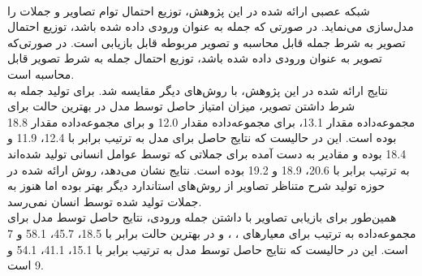\\
شبکه عصبی ارائه شده در این پژوهش، توزیع احتمال توام تصاویر و جملات را مدل‌سازی می‌نماید. در صورتی که جمله به عنوان ورودی داده شده باشد، توزیع احتمال تصویر به شرط جمله قابل محاسبه و تصویر مربوطه قابل بازیابی است. در صورتی‌که تصویر به عنوان ورودی داده شده باشد، توزیع احتمال جمله به شرط تصویر قابل محاسبه است.
\\
نتایج ارائه شده در این پژوهش، با روش‌های دیگر مقایسه شد. برای تولید جمله به شرط داشتن تصویر، میزان امتیاز  حاصل توسط مدل در بهترین حالت برای مجموعه‌داده  مقدار 13.1، برای مجموعه‌داده  مقدار 12.0 و برای مجموعه‌داده  مقدار 18.8 بوده است. این در حالیست که نتایج حاصل برای مدل  به ترتیب برابر با 12.4، 11.9 و 18.4 بوده و مقادیر به دست آمده برای جملاتی که توسط عوامل انسانی تولید شده‌اند به ترتیب برابر با 20.6، 18.9 و 19.2 بوده است. نتایج نشان می‌دهد، روش ارائه شده در حوزه تولید شرح متناظر تصاویر از روش‌های استاندارد دیگر بهتر بوده اما هنوز به جملات تولید شده توسط انسان نمی‌رسد.
\\
همین‌طور برای بازیابی تصاویر با داشتن جمله ورودی، نتایج حاصل توسط مدل برای مجموعه‌داده‌  به ترتیب برای معیارهای ، ،   و  در بهترین حالت برابر با 18.5، 45.7، 58.1 و 7 است. این در حالیست که نتایج حاصل توسط مدل  به ترتیب برابر با 15.1، 41.1، 54.1 و 9 است.

